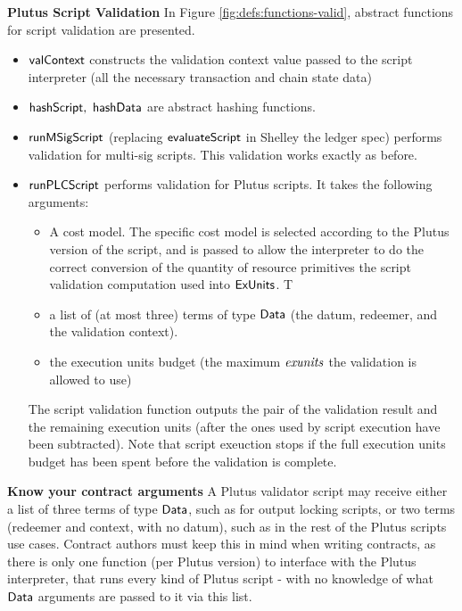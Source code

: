 \textbf{Plutus Script Validation}
In Figure \ref{fig:defs:functions-valid}, abstract functions for script validation
are presented.

\begin{itemize}
  \item $\mathsf{valContext}$ constructs the validation context value passed
  to the script interpreter (all the necessary transaction and chain state data)
  \item $\mathsf{hashScript},~ \mathsf{hashData}$ are abstract hashing functions.
  \item $\mathsf{runMSigScript}$ (replacing $\mathsf{evaluateScript}$ in Shelley the ledger spec) performs
  validation for multi-sig scripts.
  This validation works exactly as before.
  \item $\mathsf{runPLCScript}$ performs validation for Plutus scripts. It takes the following
  arguments:
  \begin{itemize}
  \item A cost model. The specific cost model is selected according to the Plutus
  version of the script, and is passed to allow the interpreter to do the
  correct conversion of the quantity of resource primitives the script validation
  computation used into $\mathsf{ExUnits}$. T
  \item
  a list of (at most three) terms of type $\mathsf{Data}$ (the datum, redeemer,
  and the validation context).
  \item the execution units budget (the maximum $\mathit{exunits}$
  the validation is allowed to use)
  \end{itemize}
  The script validation function outputs the pair of the validation result
  and the remaining execution units (after the ones used by script execution
  have been subtracted). Note that script exeuction stops if the full execution
  units budget has been spent before the validation is complete.
\end{itemize}

\begin{note}
  \textbf{Know your contract arguments}
A Plutus validator script may receive either a list of three terms of type $\mathsf{Data}$,
such as for output locking scripts, or two terms (redeemer and context, with
no datum), such as in the rest of the Plutus scripts use cases.
Contract authors must keep this in mind when writing contracts, as there is
only one function (per Plutus version) to interface with the Plutus interpreter,
that runs every kind of Plutus script - with no knowledge of what $\mathsf{Data}$ arguments
are passed to it via this list.
\end{note}

